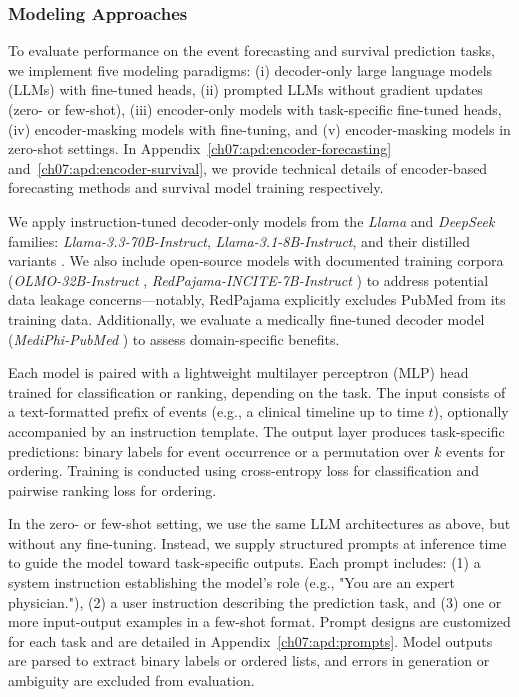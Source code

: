 \subsubsection{Modeling Approaches}
To evaluate performance on the event forecasting and survival prediction tasks, we implement five modeling paradigms: (i) decoder-only large language models (LLMs) with fine-tuned heads, (ii) prompted LLMs without gradient updates (zero- or few-shot), (iii) encoder-only models with task-specific fine-tuned heads, (iv) encoder-masking models with fine-tuning, and (v) encoder-masking models in zero-shot settings.
In Appendix~\ref{ch07:apd:encoder-forecasting} and~\ref{ch07:apd:encoder-survival}, we provide technical details of encoder-based forecasting methods and survival model training respectively.

We apply instruction-tuned decoder-only models from the \textit{Llama} and \textit{DeepSeek} families: \textit{Llama-3.3-70B-Instruct}, \textit{Llama-3.1-8B-Instruct}, and their distilled variants \citep{grattafiori2024llama,liu2024deepseek}.
We also include open-source models with documented training corpora (\textit{OLMO-32B-Instruct} \citep{olmo20242}, \textit{RedPajama-INCITE-7B-Instruct} \citep{weber2024redpajama}) to address potential data leakage concerns---notably, RedPajama explicitly excludes PubMed from its training data.
Additionally, we evaluate a medically fine-tuned decoder model (\textit{MediPhi-PubMed} \citep{corbeil2025modular}) to assess domain-specific benefits.

Each model is paired with a lightweight multilayer perceptron (MLP) head trained for classification or ranking, depending on the task. 
The input consists of a text-formatted prefix of events (e.g., a clinical timeline up to time $t$), optionally accompanied by an instruction template. 
The output layer produces task-specific predictions: binary labels for event occurrence or a permutation over $k$ events for ordering. 
Training is conducted using cross-entropy loss for classification and pairwise ranking loss for ordering.

In the zero- or few-shot setting, we use the same LLM architectures as above, but without any fine-tuning. 
Instead, we supply structured prompts at inference time to guide the model toward task-specific outputs. 
Each prompt includes: 
(1) a system instruction establishing the model’s role (e.g., "You are an expert physician."), 
(2) a user instruction describing the prediction task, and 
(3) one or more input-output examples in a few-shot format.
Prompt designs are customized for each task and are detailed in Appendix~\ref{ch07:apd:prompts}.
Model outputs are parsed to extract binary labels or ordered lists, and errors in generation or ambiguity are excluded from evaluation.

